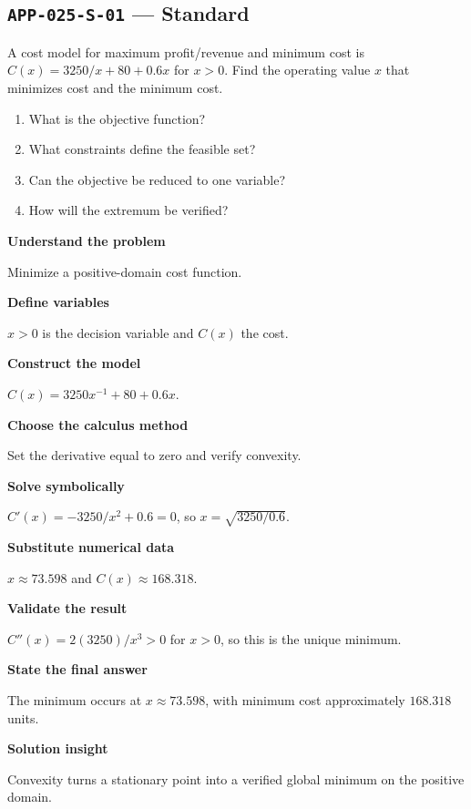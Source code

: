 \documentclass[11pt]{book}
\newcommand{\pid}[1]{\texttt{#1}}
\begin{document}
\subsection*{\pid{APP-025-S-01} — Standard}
\begin{problembox}
A cost model for maximum profit/revenue and minimum cost is $C(x)=3250/x+80+0.6x$ for $x>0$. Find the operating value $x$ that minimizes cost and the minimum cost.
\end{problembox}
\begin{promptbox}\begin{enumerate}
\item What is the objective function?
\item What constraints define the feasible set?
\item Can the objective be reduced to one variable?
\item How will the extremum be verified?
\end{enumerate}\end{promptbox}
\begin{solutionbox}
\textbf{Understand the problem}\par Minimize a positive-domain cost function.\par\medskip
\textbf{Define variables}\par $x>0$ is the decision variable and $C(x)$ the cost.\par\medskip
\textbf{Construct the model}\par $C(x)=3250x^{-1}+80+0.6x$.\par\medskip
\textbf{Choose the calculus method}\par Set the derivative equal to zero and verify convexity.\par\medskip
\textbf{Solve symbolically}\par $C'(x)=-3250/x^2+0.6=0$, so $x=\sqrt{3250/0.6}$.\par\medskip
\textbf{Substitute numerical data}\par $x\approx 73.598$ and $C(x)\approx 168.318$.\par\medskip
\textbf{Validate the result}\par $C''(x)=2(3250)/x^3>0$ for $x>0$, so this is the unique minimum.\par\medskip
\textbf{State the final answer}\par The minimum occurs at $x\approx 73.598$, with minimum cost approximately $168.318$ units.\par\medskip
\textbf{Solution insight}\par Convexity turns a stationary point into a verified global minimum on the positive domain.\par\medskip
\end{solutionbox}
\end{document}
